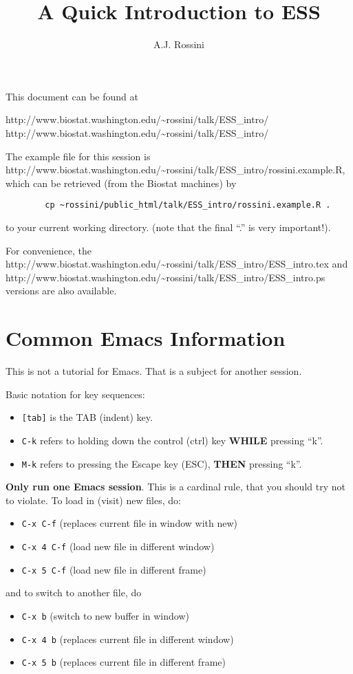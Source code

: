 \documentclass{article}
\title{A Quick Introduction to ESS}
\author{A.J. Rossini}
\begin{document}
\maketitle

This document can be found at
\begin{center}
  \htmladdnormallink
  {http://www.biostat.washington.edu/\~{}rossini/talk/ESS\_intro/}
  {http://www.biostat.washington.edu/\~{}rossini/talk/ESS\_intro/}
\end{center}
The example file for this session is
{http://www.biostat.washington.edu/\~{}rossini/talk/ESS\_intro/rossini.example.R},
which can be retrieved (from the Biostat machines) by 
\begin{verbatim}
        cp ~rossini/public_html/talk/ESS_intro/rossini.example.R .
\end{verbatim}
to your current working directory.  (note that the final ``.'' is very
important!).

For convenience, the 
{http://www.biostat.washington.edu/\~{}rossini/talk/ESS\_intro/ESS\_intro.tex}
and 
{http://www.biostat.washington.edu/\~{}rossini/talk/ESS\_intro/ESS\_intro.ps}
versions are also available.

\section{Common Emacs Information}
\label{sec:emacs}

This is not a tutorial for Emacs.  That is a subject for another session.

Basic notation for key sequences:
\begin{itemize}
\item \verb+[tab]+ is the TAB (indent) key.
\item \verb+C-k+ refers to holding down the control (ctrl) key \textbf{WHILE}
  pressing ``k''.
\item \verb+M-k+ refers to pressing the Escape key (ESC),
  \textbf{THEN} pressing ``k''.
\end{itemize}
\textbf{Only run one Emacs session}.  This is a cardinal rule, that
you should try not to violate.  To load in (visit) new files, do:
\begin{itemize}
\item \verb+C-x C-f+    (replaces current file in window with new)
\item \verb+C-x 4 C-f+  (load new file in different window)
\item \verb+C-x 5 C-f+  (load new file in different frame)
\end{itemize}
and to switch to another file, do
\begin{itemize}
\item \verb+C-x b+    (switch to new buffer in window)
\item \verb+C-x 4 b+  (replaces current file in different window)
\item \verb+C-x 5 b+  (replaces current file in different frame)
\end{itemize}
\end{document}
